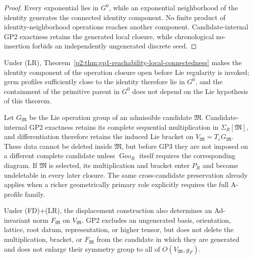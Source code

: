 \documentclass[11pt,a4paper]{article}
\begin{document}
\begin{proof}
Every exponential lies in \(G^0\), while an exponential neighborhood of the
identity generates the connected identity component.  No finite product of
identity-neighborhood operations reaches another component.  Candidate-internal
GP2 exactness retains the generated local closure, while chronological
no-insertion forbids an independently ungenerated discrete seed.
\end{proof}

Under (LR), Theorem~\ref{p2:thm:gp1-reachability-local-connectedness} makes
the identity component of the operation closure open before Lie regularity is
invoked; germ profiles sufficiently close to the identity therefore lie in
\(G^0\), and the containment of the primitive parent in \(G^0\) does not
depend on the Lie hypothesis of this theorem.

\begin{theorem}
\label{p2:thm:gp2-alone-frame-natural-alternatives}
Let \(G_{\mathfrak M}\) be the Lie operation group of an admissible candidate
\(\mathfrak M\).  Candidate-internal GP2 exactness retains its complete
sequential multiplication in \(\Sigma_R[\mathfrak M]\), and differentiation
therefore retains the induced Lie bracket on
\(V_{\mathfrak M}=T_eG_{\mathfrak M}\).  These data cannot be deleted inside
\(\mathfrak M\), but before GP3 they are not imposed on a different complete
candidate unless \(\operatorname{Geo}_R\) itself requires the corresponding
diagram.  If \(\mathfrak M\) is selected, its multiplication and bracket enter
\(P_R\) and become undeletable in every later closure.  The same
cross-candidate preservation already applies when a richer geometrically
primary role explicitly requires the full A-profile family.

Under (FD)+(LR), the displacement construction also determines an
Ad-invariant norm \(F_{\mathfrak M}\) on \(V_{\mathfrak M}\).  GP2 excludes an
ungenerated basis, orientation, lattice, root datum, representation, or higher
tensor, but does not delete the multiplication, bracket, or
\(F_{\mathfrak M}\) from the candidate in which they are generated and does
not enlarge their symmetry group to all of
\(O(V_{\mathfrak M},g_F)\).
\end{theorem}
\end{document}
